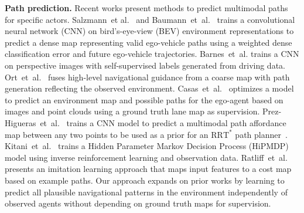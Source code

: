\documentclass[letterpaper, 10 pt, conference]{ieeeconf}
\begin{document}
\noindent \textbf{Path prediction.} Recent works present methods to predict multimodal paths for specific actors.
Salzmann~et al.~\cite{salzmann2019online_path_generation} and Baumann~et~al.~\cite{baumann2018ego_path} trains a convolutional neural network (CNN) on bird's-eye-view (BEV) environment representations to predict a dense map representing valid ego-vehicle paths using a weighted dense classification error and future ego-vehicle trajectories. Barnes~et~al.\cite{barnes2017ws_path_proposal} trains a CNN on perspective images with self-supervised labels generated from driving data. Ort~et~al.~\cite{ort2020maplite} fuses high-level navigational guidance from a coarse map with path generation reflecting the observed environment. Casas~et~al.~\cite{casas2021mp3} optimizes a model to predict an environment map and possible paths for the ego-agent based on images and point clouds using a ground truth lane map as supervision.
Prez-Higueras~et~al.~\cite{prez-higueras2018point_to_point_path} trains a CNN model to predict a multimodal path affordance map between any two points to be used as a prior for an $\text{RRT}^*$ path planner~\cite{karaman2011RRT_star}. 
Kitani~et~al.~\cite{kitani2012activity_forcasting} trains a Hidden Parameter Markov Decision Process (HiPMDP) model
using inverse reinforcement learning and observation data. Ratliff~et~al.~\cite{ratliff2009learch} presents an imitation learning approach that maps input features to a cost map based on example paths.
Our approach expands on prior works by learning to  predict all plausible navigational patterns in the environment independently of observed agents without depending on ground truth maps for supervision.
\end{document}
